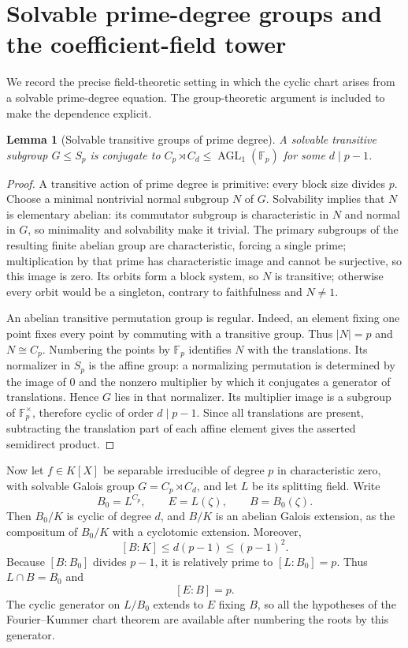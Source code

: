 \documentclass[11pt,a4paper]{article}
\newtheorem{lemma}[theorem]{Lemma}
\theoremstyle{definition}
\theoremstyle{remark}
\newcommand{\F}{\mathbb F}
\newcommand{\AGL}{\operatorname{AGL}}
\begin{document}
\section{Solvable prime-degree groups and the coefficient-field tower}
\label{rss:sec:groups}

We record the precise field-theoretic setting in which the cyclic chart
arises from a solvable prime-degree equation. The group-theoretic argument
is included to make the dependence explicit.

\begin{lemma}[Solvable transitive groups of prime degree]\label{rss:lem:affine}
A solvable transitive subgroup $G\leq S_p$ is conjugate to
$C_p\rtimes C_d\leq\AGL_1(\F_p)$ for some $d\mid p-1$.
\end{lemma}
\begin{proof}
A transitive action of prime degree is primitive: every block size divides
$p$. Choose a minimal nontrivial normal subgroup $N$ of $G$. Solvability
implies that $N$ is elementary abelian: its commutator subgroup is
characteristic in $N$ and normal in $G$, so minimality and solvability make
it trivial. The primary subgroups of the resulting finite abelian group
are characteristic, forcing a single prime; multiplication by that prime
has characteristic image and cannot be surjective, so this image is zero.
Its orbits form a block system,
so $N$ is transitive; otherwise every orbit would be a singleton, contrary
to faithfulness and $N\neq1$.

An abelian transitive permutation group is regular. Indeed, an element
fixing one point fixes every point by commuting with a transitive group.
Thus $|N|=p$ and $N\cong C_p$. Numbering the points by $\F_p$ identifies
$N$ with the translations. Its normalizer in $S_p$ is the affine group:
a normalizing permutation is determined by the image of $0$ and the
nonzero multiplier by which it conjugates a generator of translations.
Hence $G$ lies in that normalizer. Its multiplier image is a subgroup of
$\F_p^\times$, therefore cyclic of order $d\mid p-1$. Since all
translations are present, subtracting the translation part of each affine
element gives the asserted semidirect product.
\end{proof}

Now let $f\in K[X]$ be separable irreducible of degree $p$ in characteristic
zero, with solvable Galois group $G=C_p\rtimes C_d$, and let $L$ be its
splitting field. Write
\[
 B_0=L^{C_p},\qquad E=L(\zeta),\qquad B=B_0(\zeta).
\]
Then $B_0/K$ is cyclic of degree $d$, and $B/K$ is an abelian Galois
extension, as the compositum of $B_0/K$ with a cyclotomic extension.
Moreover,
\[
 [B:K]\leq d(p-1)\leq(p-1)^2.
\]
Because $[B:B_0]$ divides $p-1$, it is relatively prime to
$[L:B_0]=p$. Thus $L\cap B=B_0$ and
\[
 [E:B]=p.
\]
The cyclic generator on $L/B_0$ extends to $E$ fixing $B$, so all the
hypotheses of the Fourier--Kummer chart theorem are available after
numbering the roots by this generator.
\end{document}
